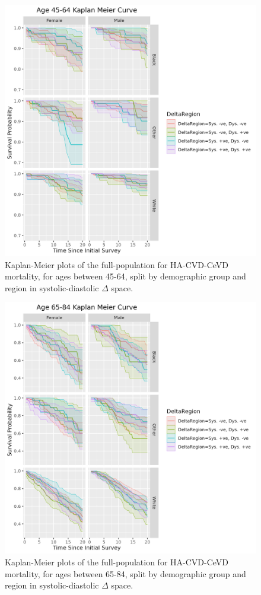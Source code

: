\documentclass[
]{article}
\begin{document}
\begin{figure}
\hypertarget{fig:KM45_deltaregion}{%
\centering
\includegraphics{./Rmarkdown_Plots/SurvProbKM_Delta_45-65.png}
\caption{Kaplan-Meier plots of the full-population for HA-CVD-CeVD mortality, for ages between 45-64, split by demographic group and region in systolic-diastolic \(\Delta\) space.}\label{fig:KM45_deltaregion}
}
\end{figure}

\begin{figure}
\hypertarget{fig:KM65_deltaregion}{%
\centering
\includegraphics{./Rmarkdown_Plots/SurvProbKM_Delta_65-85.png}
\caption{Kaplan-Meier plots of the full-population for HA-CVD-CeVD mortality, for ages between 65-84, split by demographic group and region in systolic-diastolic \(\Delta\) space.}\label{fig:KM65_deltaregion}
}
\end{figure}
\end{document}
